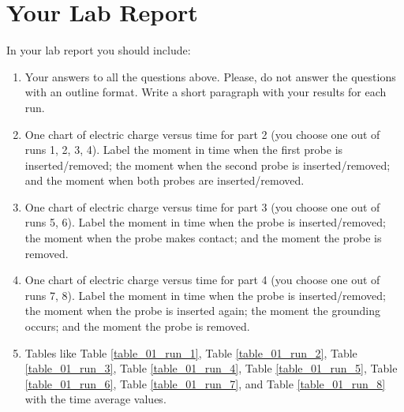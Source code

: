 \section{Your Lab Report}
%
In your lab report you should include:
\begin{enumerate}
	\item Your answers to all the questions above. Please, do not answer the questions with an outline format. Write a short paragraph with your results for each run.
	\item One chart of electric charge versus time for part 2 (you choose one out of runs 1, 2, 3, 4). Label the moment in time when the first probe is inserted/removed; the moment when the second probe is inserted/removed; and the moment when both probes are inserted/removed.
	\item One chart of electric charge versus time for part 3 (you choose one out of runs 5, 6). Label the moment in time when the probe is inserted/removed; the moment when the probe makes contact; and the moment the probe is removed.
	\item One chart of electric charge versus time for part 4 (you choose one out of runs 7, 8). Label the moment in time when the probe is inserted/removed; the moment when the probe is inserted again; the moment the grounding occurs; and the moment the probe is removed.
	\item Tables like Table \ref{table_01_run_1}, Table \ref{table_01_run_2}, Table \ref{table_01_run_3}, Table \ref{table_01_run_4}, Table \ref{table_01_run_5}, Table \ref{table_01_run_6}, Table \ref{table_01_run_7}, and Table \ref{table_01_run_8} with the time average values.
\end{enumerate}
%
\newpage
